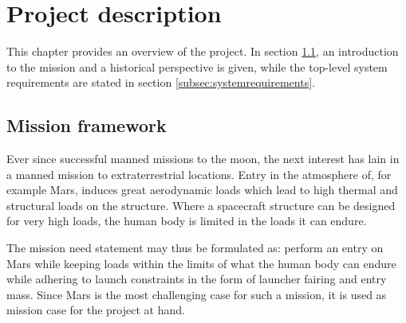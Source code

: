 \section{Project description}\label{cha:project_description}%
This chapter provides an overview of the project. In section \ref{subsec:missionframework}, an introduction to the mission and a historical perspective is given, while the top-level system requirements are stated in section \ref{subsec:systemrequirements}.

\subsection{Mission framework} 
\label{subsec:missionframework}
Ever since successful manned missions to the moon, the next interest has lain in a manned mission to extraterrestrial locations. Entry in the atmosphere of, for example Mars, induces great aerodynamic loads which lead to high thermal and structural loads on the structure. Where a spacecraft structure can be designed for very high loads, the human body is limited in the loads it can endure. 

The mission need statement may thus be formulated as: perform an entry on Mars while keeping loads within the limits of what the human body can endure while adhering to launch constraints in the form of launcher fairing and entry mass. Since Mars is the most challenging case for such a mission, it is used as mission case for the project at hand.

